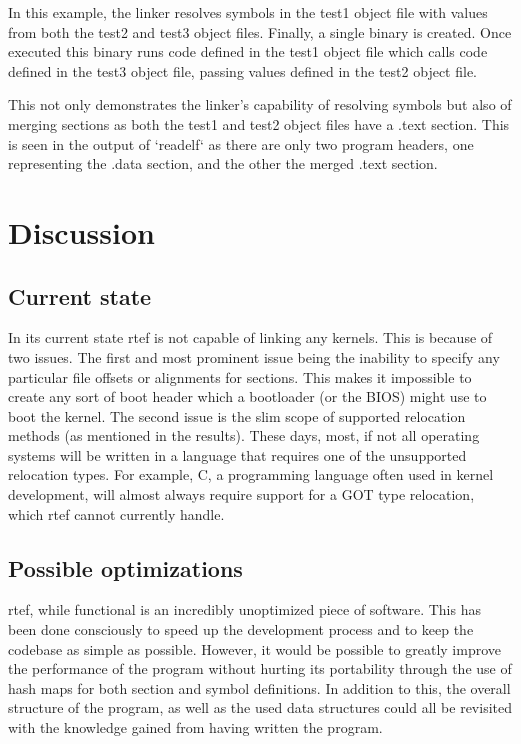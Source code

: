 \documentclass[notitlepage]{report}
\begin{document}
In this example, the linker resolves symbols in the test1 object file with values from both the test2 and test3 object files. Finally, a single binary is created. Once executed this binary runs code defined in the test1 object file which calls code defined in the test3 object file, passing values defined in the test2 object file.

This not only demonstrates the linker's capability of resolving symbols but also of merging sections as both the test1 and test2 object files have a .text section. This is seen in the output of `readelf` as there are only two program headers, one representing the .data section, and the other the merged .text section.

\section{Discussion}

\subsection{Current state}

In its current state rtef is not capable of linking any kernels. This is because of two issues. The first and most prominent issue being the inability to specify any particular file offsets or alignments for sections. This makes it impossible to create any sort of boot header which a bootloader (or the BIOS) might use to boot the kernel. The second issue is the slim scope of supported relocation methods (as mentioned in the results). These days, most, if not all operating systems will be written in a language that requires one of the unsupported relocation types. For example, C, a programming language often used in kernel development, will almost always require support for a GOT type relocation, which rtef cannot currently handle.

\subsection{Possible optimizations}

rtef, while functional is an incredibly unoptimized piece of software. This has been done consciously to speed up the development process and to keep the codebase as simple as possible. However, it would be possible to greatly improve the performance of the program without hurting its portability through the use of hash maps for both section and symbol definitions. In addition to this, the overall structure of the program, as well as the used data structures could all be revisited with the knowledge gained from having written the program.
\end{document}
